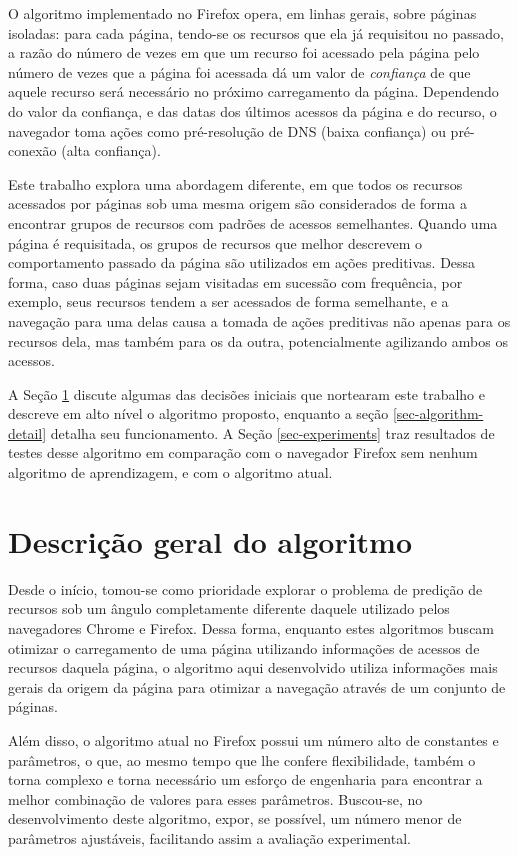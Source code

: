 \documentclass[10pt,twocolumn,letterpaper]{article}
\begin{document}
O algoritmo implementado no Firefox opera, em linhas gerais, sobre páginas isoladas: para cada página, tendo-se os recursos que ela já requisitou no passado, a razão do número de vezes em que um recurso foi acessado pela página pelo número de vezes que a página foi acessada dá um valor de \emph{confiança} de que aquele recurso será necessário no próximo carregamento da página. Dependendo do valor da confiança, e das datas dos últimos acessos da página e do recurso, o navegador toma ações como pré-resolução de DNS  (baixa confiança) ou pré-conexão (alta confiança).

Este trabalho explora uma abordagem diferente, em que todos os recursos acessados por páginas sob uma mesma origem são considerados de forma a encontrar grupos de recursos com padrões de acessos semelhantes. Quando uma página é requisitada, os grupos de recursos que melhor descrevem o comportamento passado da página são utilizados em ações preditivas. Dessa forma, caso duas páginas sejam visitadas em sucessão com frequência, por exemplo, seus recursos tendem a ser acessados de forma semelhante, e a navegação para uma delas causa a tomada de ações preditivas não apenas para os recursos dela, mas também para os da outra, potencialmente agilizando ambos os acessos.

A Seção \ref{sec-algorithm-highlevel} discute algumas das decisões iniciais que nortearam este trabalho e descreve em alto nível o algoritmo proposto, enquanto a seção \ref{sec-algorithm-detail} detalha seu funcionamento. A Seção \ref{sec-experiments} traz resultados de testes desse algoritmo em comparação com o navegador Firefox sem nenhum algoritmo de aprendizagem, e com o algoritmo atual.

\section{Descrição geral do algoritmo}
\label{sec-algorithm-highlevel}

Desde o início, tomou-se como prioridade explorar o problema de predição de recursos sob um ângulo completamente diferente daquele utilizado pelos navegadores Chrome e Firefox. Dessa forma, enquanto estes algoritmos buscam otimizar o carregamento de uma página utilizando informações de acessos de recursos daquela página, o algoritmo aqui desenvolvido utiliza informações mais gerais da origem da página para otimizar a navegação através de um conjunto de páginas.

Além disso, o algoritmo atual no Firefox possui um número alto de constantes e parâmetros, o que, ao mesmo tempo que lhe confere flexibilidade, também o torna complexo e torna necessário um esforço de engenharia para encontrar a melhor combinação de valores para esses parâmetros. Buscou-se, no desenvolvimento deste algoritmo, expor, se possível, um número menor de parâmetros ajustáveis, facilitando assim a avaliação experimental.
\end{document}

